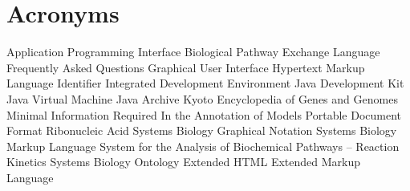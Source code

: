 \chapter{Acronyms}
\begin{acronym}
        {Application Programming Interface}
     {Biological Pathway Exchange Language}
        {Frequently Asked Questions}
        {Graphical User Interface}
       {Hypertext Markup Language}
         {Identifier}
        {Integrated Development Environment}
        {Java\texttrademark{} Development Kit}
        {Java\texttrademark{} Virtual Machine}
        {Java\texttrademark{} Archive}
       {Kyoto Encyclopedia of Genes and Genomes}
     {Minimal Information Required In the Annotation of Models}
        {Portable Document Format}
        {Ribonucleic Acid}
       {Systems Biology Graphical Notation}
       {Systems Biology Markup Language}
   {System for the Analysis of Biochemical Pathways -- Reaction Kinetics}
        {Systems Biology Ontology}
      {Extended \acs{HTML}}
        {Extended Markup Language}
\end{acronym}
